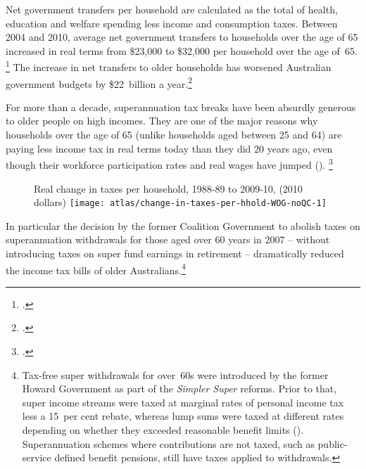 \documentclass[continuous]{grattan}\usepackage[]{graphicx}\usepackage[]{color}
\newenvironment{knitrout}{}{} %
\begin{document}
Net government transfers per household are calculated as the total of health, education and welfare spending less income and consumption taxes.
Between 2004 and 2010, average net government transfers to households over the age of 65 increased in real terms from  \$23,000 to \$32,000 per household over the age of~65.%
\footcite[][22]{DaleyWoodWeidmannEtAl2014} %
The increase in net transfers to older households has worsened Australian government budgets by \$22~billion a year.\footcite[][22]{DaleyWoodWeidmannEtAl2014}

For more than a decade, superannuation tax breaks have been absurdly generous to older people on high incomes.
They are one of the major reasons why households over the age of 65 (unlike households aged between 25 and 64) are paying less income tax in real terms today than they did 20 years ago, even though their workforce participation rates and real wages have jumped ().%
\footcite[][27]{DaleyWoodWeidmannEtAl2014} 

\begin{figure}
%
{Real change in taxes per household, 1988-89 to 2009-10, (2010 dollars)}
\begin{knitrout}
\color{fgcolor}
\texttt{[image: atlas/change-in-taxes-per-hhold-WOG-noQC-1]} 

\end{knitrout}
\end{figure}

In particular the decision by the former Coalition Government to abolish taxes on superannuation withdrawals for those aged over 60 years in 2007 -- without introducing taxes on super fund earnings in retirement -- dramatically reduced the income tax bills of older Australians.\footnote{\label{footnote:Simple-super-reforms}Tax-free super withdrawals for over~60s were introduced by the former Howard Government as part of the \textit{Simpler Super} reforms. 
Prior to that, super income streams were taxed at marginal rates of personal income tax less a 15~per cent rebate, whereas lump sums were taxed at different rates depending on whether they exceeded reasonable benefit limits (\textcite{Treasury2008RetirementIncomeConsultPaper}). 
Superannuation schemes where contributions are not taxed, such as public-service defined benefit pensions, still have taxes applied to withdrawals.} 
\end{document}
